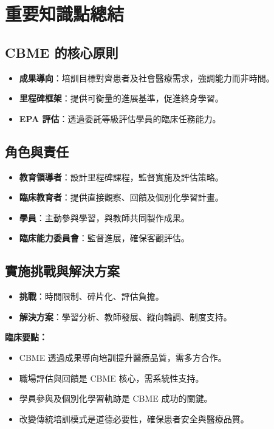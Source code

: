 \documentclass[12pt,a4paper]{article}
\begin{document}
\section{重要知識點總結}

\subsection{CBME 的核心原則}
\begin{itemize}[nosep]
    \item \textbf{成果導向}：培訓目標對齊患者及社會醫療需求，強調能力而非時間。
    \item \textbf{里程碑框架}：提供可衡量的進展基準，促進終身學習。
    \item \textbf{EPA 評估}：透過委託等級評估學員的臨床任務能力。
\end{itemize}

\subsection{角色與責任}
\begin{itemize}[nosep]
    \item \textbf{教育領導者}：設計里程碑課程，監督實施及評估策略。
    \item \textbf{臨床教育者}：提供直接觀察、回饋及個別化學習計畫。
    \item \textbf{學員}：主動參與學習，與教師共同製作成果。
    \item \textbf{臨床能力委員會}：監督進展，確保客觀評估。
\end{itemize}

\subsection{實施挑戰與解決方案}
\begin{itemize}[nosep]
    \item \textbf{挑戰}：時間限制、碎片化、評估負擔。
    \item \textbf{解決方案}：學習分析、教師發展、縱向輪調、制度支持。
\end{itemize}

\begin{importantbox}
\textbf{臨床要點：}
\begin{itemize}[nosep]
    \item CBME 透過成果導向培訓提升醫療品質，需多方合作。
    \item 職場評估與回饋是 CBME 核心，需系統性支持。
    \item 學員參與及個別化學習軌跡是 CBME 成功的關鍵。
    \item 改變傳統培訓模式是道德必要性，確保患者安全與醫療品質。
\end{itemize}
\end{importantbox}
\end{document}
